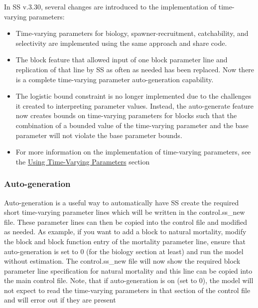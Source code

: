 In SS v.3.30, several changes are introduced to the implementation of time-varying parameters:

\begin{itemize}
  \item	Time-varying parameters for biology, spawner-recruitment, catchability, and selectivity are implemented using the same approach and share code.
  \item The block feature that allowed input of one block parameter line and replication of that line by SS as often as needed has been replaced.  Now there is a complete time-varying parameter auto-generation capability.
  \item The logistic bound constraint is no longer implemented due to the challenges it created to interpreting parameter values. Instead, the auto-generate feature now creates bounds on time-varying parameters for blocks such that the combination of a bounded  value of the time-varying parameter and the base parameter will not violate the base parameter bounds.
  \item For more information on the implementation of time-varying parameters, see the \hyperlink{TVpara}{Using Time-Varying Parameters} section
\end{itemize}	

\subsubsection{Auto-generation}
Auto-generation is a useful way to automatically have SS create the required short time-varying parameter lines which will be written in the control.ss\_new file. These parameter lines can then be copied into the control file and modified as needed. As example, if you want to add a block to natural mortality, modify the block and block function entry of the mortality parameter line, ensure that auto-generation is set to 0 (for the biology section at least) and run the model without estimation. The control.ss\_new file will now show the required block parameter line specification for natural mortality and this line can be copied into the main control file.  Note, that if auto-generation is on (set to 0), the model will not expect to read the time-varying parameters in that section of the control file and will error out if they are present

